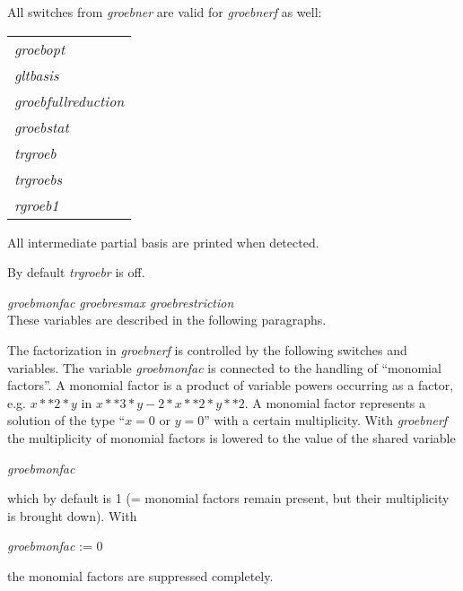 All switches from \emph{groebner} are valid for \emph{groebnerf} as well:
\begin{center}
\begin{tabular}{l}
\emph{groebopt} \\
\emph{gltbasis} \\
\emph{groebfullreduction} \\
\emph{groebstat} \\
\emph{trgroeb} \\
\emph{trgroebs} \\
\emph{rgroeb1}
\end{tabular}
\end{center}

\begin{description}

\item[\emph{trgroebr} --]
\hypertarget{switch:TRGROEBR}{}
  All intermediate partial basis are printed when detected.

By default \emph{trgroebr} is off.
\end{description}
{\it groebmonfac  groebresmax  groebrestriction} \\
\hspace*{.5cm} These variables are described in the following
paragraphs.

The factorization in \emph{groebnerf} is controlled by the following
switches and variables.  The variable \emph{groebmonfac} is connected to
the handling of ``monomial factors''.  A monomial factor is a product
of variable powers occurring as a factor, e.g. $ x**2*y$  in  $x**3*y -
2*x**2*y**2$.  A monomial factor represents a solution of the type
``$ x = 0$  or  $y = 0$'' with a certain multiplicity.  With
\emph{groebnerf} 
the multiplicity of monomial factors is lowered to the value of the
shared variable
\hypertarget{reserved:GROEBMONFAC}{}
\begin{center}
 \emph{groebmonfac}
\end{center}
which by default is 1 (= monomial factors remain present, but their
multiplicity is brought down). With
\begin{center}
\emph{groebmonfac} := 0
\end{center}
the monomial factors are suppressed completely.

